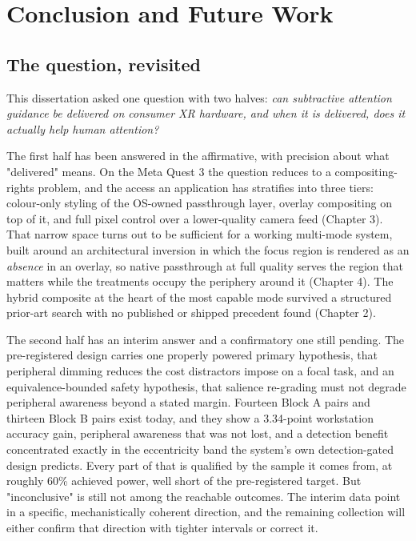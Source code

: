 \chapter{Conclusion and Future Work}

\section{The question, revisited}

This dissertation asked one question with two halves: \textit{can subtractive attention guidance be
delivered on consumer XR hardware, and when it is delivered, does it actually help human attention?}

The first half has been answered in the affirmative, with precision about what "delivered" means. On
the Meta Quest 3 the question reduces to a compositing-rights problem, and the access an application
has stratifies into three tiers: colour-only styling of the OS-owned passthrough layer, overlay
compositing on top of it, and full pixel control over a lower-quality camera feed (Chapter 3). That
narrow space turns out to be sufficient for a working multi-mode system, built around an
architectural inversion in which the focus region is rendered as an \textit{absence} in an overlay, so
native passthrough at full quality serves the region that matters while the treatments occupy the
periphery around it (Chapter 4). The hybrid composite at the heart of the most capable mode survived
a structured prior-art search with no published or shipped precedent found (Chapter 2).

The second half has an interim answer and a confirmatory one still pending. The pre-registered design
carries one properly powered primary hypothesis, that peripheral dimming reduces the cost distractors
impose on a focal task, and an equivalence-bounded safety hypothesis, that salience re-grading must
not degrade peripheral awareness beyond a stated margin. Fourteen Block A pairs and thirteen Block B
pairs exist today, and they show a 3.34-point workstation accuracy gain, peripheral awareness that
was not lost, and a detection benefit concentrated exactly in the eccentricity band the system's own
detection-gated design predicts. Every part of that is qualified by the sample it comes from, at
roughly 60\% achieved power, well short of the pre-registered target. But "inconclusive" is still not among the reachable
outcomes. The interim data point in a specific, mechanistically coherent direction, and the remaining
collection will either confirm that direction with tighter intervals or correct it.

